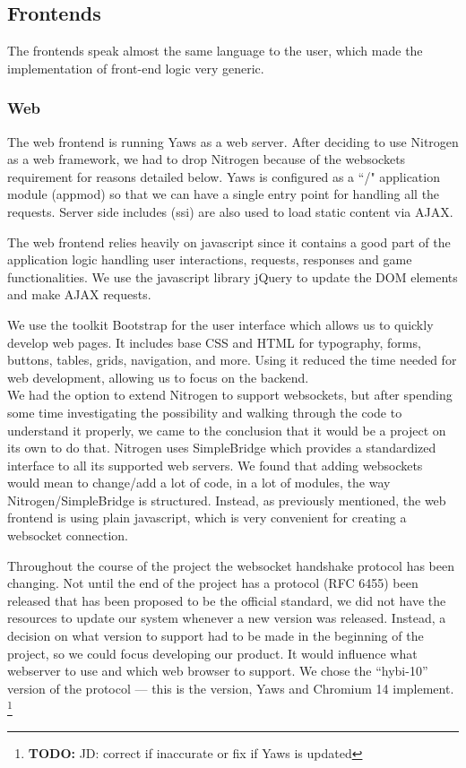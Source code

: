 \documentclass[11pt,a4paper]{report}
\newcommand{\todo}[1]{\footnote{{\color{red} {\bf TODO:} #1}}}
\begin{document}
\subsection{Frontends}
\label{sec:frontends}
The frontends speak almost the same language to the user, which made the
implementation of front-end logic very generic.

\subsubsection{Web}
The web frontend is running Yaws as a web server.
After deciding to use Nitrogen as a web framework, we had to drop Nitrogen
because of the websockets requirement for reasons detailed below.
Yaws is configured as a ``/" application module (appmod) so that we can have a
single entry point for handling all the requests. Server side includes (ssi) are
also used to load static content via AJAX.

The web frontend relies heavily on javascript since it contains a good part
of the application logic handling user interactions, requests, responses
and game functionalities. We use the javascript library jQuery\cite{jquery}
to update the DOM elements and make AJAX requests.

We use the toolkit Bootstrap\cite{bootstrap} for the user interface which
allows us to quickly develop web pages. It includes base CSS and HTML for
typography, forms, buttons, tables, grids, navigation, and more. Using it
reduced the time needed for web development, allowing us to focus on the
backend.\\

We had the option to extend Nitrogen to support websockets, but after spending
some time investigating the possibility and walking through the code to
understand it properly, we came to the conclusion that it would be a project on
its own to do that. Nitrogen uses SimpleBridge which provides a standardized
interface to all its supported web servers. We found that adding websockets
would mean to change/add a lot of code, in a lot of modules, the way
Nitrogen/SimpleBridge is structured. Instead, as previously mentioned, the web
frontend is using plain javascript, which is very convenient for creating a
websocket connection.

Throughout the course of the project the websocket handshake protocol has
been changing.
Not until the end of the project has a protocol (RFC 6455) been released that
has been proposed to be the official standard, we did not have the resources
to update our system whenever a new version was released. Instead, a decision
on what version to support had to be made in the beginning of the project, so we
could focus developing our product.
It would influence what webserver to use and which web browser to support. We
chose the ``hybi-10'' version of the protocol --- this is the version, Yaws and
Chromium 14 implement.
\todo{JD: correct if inaccurate or fix if Yaws is updated}
\end{document}
